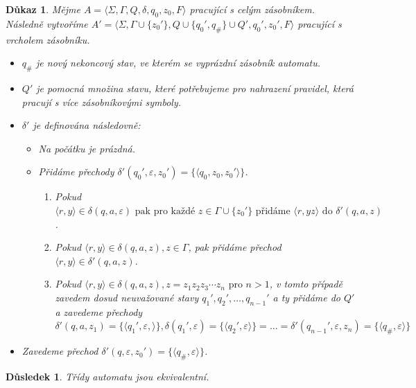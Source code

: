 \documentclass[10pt, a4paper, titlepage]{article}
\theoremstyle{note}
\newtheorem{dukaz}{\textbf{Důkaz}}
\newtheorem{dusledek}{\textbf{Důsledek}}
\begin{document}
\begin{dukaz}
Mějme $A = \langle \Sigma, \Gamma, Q, \delta, q_0, z_0, F \rangle$ pracující s celým zásobníkem. Následně vytvoříme
$A' = \langle \Sigma, \Gamma \cup \lbrace z_0' \rbrace, Q \cup \lbrace q_0', q_\# \rbrace \cup Q', q_0', z_0', F \rangle$ pracující s vrcholem
zásobníku.
\begin{itemize}
\item
$q_\#$ je nový nekoncový stav, ve kterém se vyprázdní zásobník automatu.

\item
$Q'$ je pomocná množina stavu, které potřebujeme pro nahrazení pravidel, která pracují s více zásobníkovými symboly.

\item
$\delta'$ je definována následovně:
\begin{itemize}
\item
Na počátku je prázdná.

\item
Přidáme přechody $\delta'(q_0', \varepsilon, z_0') = \lbrace \langle q_0, z_0, z_0' \rangle \rbrace$.
\begin{enumerate}
\item
Pokud $\langle r, y \rangle \in \delta(q, a, \varepsilon) \text{ pak pro každé } z \in \Gamma \cup \lbrace z_0' \rbrace \text{ přidáme }
\langle r, yz \rangle \text{ do } \delta'(q, a, z)$.

\item
Pokud $\langle r, y \rangle \in \delta(q, a, z), z \in \Gamma$, pak přidáme přechod $\langle r, y \rangle \in \delta'(q, a, z)$.

\item
Pokud $\langle r, y \rangle \in \delta(q, a, z), z = z_1z_2z_3 \cdots z_n \text{ pro } n > 1$, v tomto případě zavedem dosud neuvažované stavy
$q_1',q_2',\ldots,q_{n-1}'$ a ty přidáme do $Q'$ a zavedeme přechody $\delta'(q, a, z_1) = \lbrace \langle q_1', \varepsilon, \rangle \rbrace,
\delta(q_1', \varepsilon) = \lbrace \langle q_2', \varepsilon \rangle \rbrace = \ldots = \delta'(q_{n-1}', \varepsilon, z_n) =
\lbrace \langle q_\#, \varepsilon \rangle \rbrace$
\end{enumerate}
\end{itemize}

\item
Zavedeme přechod $\delta'(q, \varepsilon, z_0') = \lbrace \langle q_\#, \varepsilon \rangle \rbrace$.
\end{itemize}
\end{dukaz}
\begin{dusledek}
Třídy automatu jsou ekvivalentní.
\end{dusledek}
\end{document}

